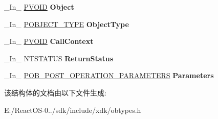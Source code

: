 \begin{DoxyCompactItemize}
\begin{tabbing}
\end{tabbing}\item 
\mbox{\label{struct___o_b___p_o_s_t___o_p_e_r_a_t_i_o_n___i_n_f_o_r_m_a_t_i_o_n_ac61e3b9f7d37202b8e0fca660c59c622}} 
\+\_\+\+In\+\_\+ \hyperlink{interfacevoid}{P\+V\+O\+ID} {\bfseries Object}
\item 
\mbox{\label{struct___o_b___p_o_s_t___o_p_e_r_a_t_i_o_n___i_n_f_o_r_m_a_t_i_o_n_a592c509114c4ab14f68acbd1c4498e05}} 
\+\_\+\+In\+\_\+ \hyperlink{struct___o_b_j_e_c_t___t_y_p_e}{P\+O\+B\+J\+E\+C\+T\+\_\+\+T\+Y\+PE} {\bfseries Object\+Type}
\item 
\mbox{\label{struct___o_b___p_o_s_t___o_p_e_r_a_t_i_o_n___i_n_f_o_r_m_a_t_i_o_n_a41120c2b7f4e71332ba4640ef91d5ee8}} 
\+\_\+\+In\+\_\+ \hyperlink{interfacevoid}{P\+V\+O\+ID} {\bfseries Call\+Context}
\item 
\mbox{\label{struct___o_b___p_o_s_t___o_p_e_r_a_t_i_o_n___i_n_f_o_r_m_a_t_i_o_n_a21519edaee2608e27be0f2e6d80a6f0d}} 
\+\_\+\+In\+\_\+ N\+T\+S\+T\+A\+T\+US {\bfseries Return\+Status}
\item 
\mbox{\label{struct___o_b___p_o_s_t___o_p_e_r_a_t_i_o_n___i_n_f_o_r_m_a_t_i_o_n_a578c49a3394c124bb6e6a64ea2fdba49}} 
\+\_\+\+In\+\_\+ \hyperlink{union___o_b___p_o_s_t___o_p_e_r_a_t_i_o_n___p_a_r_a_m_e_t_e_r_s}{P\+O\+B\+\_\+\+P\+O\+S\+T\+\_\+\+O\+P\+E\+R\+A\+T\+I\+O\+N\+\_\+\+P\+A\+R\+A\+M\+E\+T\+E\+RS} {\bfseries Parameters}
\end{DoxyCompactItemize}


该结构体的文档由以下文件生成\+:\begin{DoxyCompactItemize}
\item 
E\+:/\+React\+O\+S-\/0../sdk/include/xdk/obtypes.\+h\end{DoxyCompactItemize}
